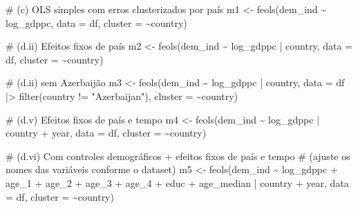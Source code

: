 \documentclass[
  portuguese,
  letterpaper,
  DIV=11,
  numbers=noendperiod]{scrartcl}
\newenvironment{Shaded}{\begin{snugshade}}{\end{snugshade}}
\newcommand{\AttributeTok}[1]{\textcolor[rgb]{0.40,0.45,0.13}{#1}}
\newcommand{\CommentTok}[1]{\textcolor[rgb]{0.37,0.37,0.37}{#1}}
\newcommand{\FunctionTok}[1]{\textcolor[rgb]{0.28,0.35,0.67}{#1}}
\newcommand{\NormalTok}[1]{\textcolor[rgb]{0.00,0.23,0.31}{#1}}
\newcommand{\OtherTok}[1]{\textcolor[rgb]{0.00,0.23,0.31}{#1}}
\newcommand{\SpecialCharTok}[1]{\textcolor[rgb]{0.37,0.37,0.37}{#1}}
\newcommand{\StringTok}[1]{\textcolor[rgb]{0.13,0.47,0.30}{#1}}
\begin{document}
\begin{Shaded}
\begin{Highlighting}[]
\CommentTok{\# (c) OLS simples com erros clusterizados por país}
\NormalTok{m1 }\OtherTok{\textless{}{-}} \FunctionTok{feols}\NormalTok{(dem\_ind }\SpecialCharTok{\textasciitilde{}}\NormalTok{ log\_gdppc,}
            \AttributeTok{data    =}\NormalTok{ df,}
            \AttributeTok{cluster =} \SpecialCharTok{\textasciitilde{}}\NormalTok{country)}

\CommentTok{\# (d.ii) Efeitos fixos de país}
\NormalTok{m2 }\OtherTok{\textless{}{-}} \FunctionTok{feols}\NormalTok{(dem\_ind }\SpecialCharTok{\textasciitilde{}}\NormalTok{ log\_gdppc }\SpecialCharTok{|}\NormalTok{ country,}
            \AttributeTok{data    =}\NormalTok{ df,}
            \AttributeTok{cluster =} \SpecialCharTok{\textasciitilde{}}\NormalTok{country)}

\CommentTok{\# (d.ii) sem Azerbaijão}
\NormalTok{m3 }\OtherTok{\textless{}{-}} \FunctionTok{feols}\NormalTok{(dem\_ind }\SpecialCharTok{\textasciitilde{}}\NormalTok{ log\_gdppc }\SpecialCharTok{|}\NormalTok{ country,}
            \AttributeTok{data    =}\NormalTok{ df }\SpecialCharTok{|\textgreater{}} \FunctionTok{filter}\NormalTok{(country }\SpecialCharTok{!=} \StringTok{"Azerbaijan"}\NormalTok{),}
            \AttributeTok{cluster =} \SpecialCharTok{\textasciitilde{}}\NormalTok{country)}

\CommentTok{\# (d.v) Efeitos fixos de país e tempo}
\NormalTok{m4 }\OtherTok{\textless{}{-}} \FunctionTok{feols}\NormalTok{(dem\_ind }\SpecialCharTok{\textasciitilde{}}\NormalTok{ log\_gdppc }\SpecialCharTok{|}\NormalTok{ country }\SpecialCharTok{+}\NormalTok{ year,}
            \AttributeTok{data    =}\NormalTok{ df,}
            \AttributeTok{cluster =} \SpecialCharTok{\textasciitilde{}}\NormalTok{country)}

\CommentTok{\# (d.vi) Com controles demográficos + efeitos fixos de país e tempo}
\CommentTok{\# (ajuste os nomes das variáveis conforme o dataset)}
\NormalTok{m5 }\OtherTok{\textless{}{-}} \FunctionTok{feols}\NormalTok{(dem\_ind }\SpecialCharTok{\textasciitilde{}}\NormalTok{ log\_gdppc }\SpecialCharTok{+}\NormalTok{ age\_1 }\SpecialCharTok{+}\NormalTok{ age\_2 }\SpecialCharTok{+}\NormalTok{ age\_3 }\SpecialCharTok{+}\NormalTok{ age\_4 }\SpecialCharTok{+}\NormalTok{ educ }\SpecialCharTok{+}\NormalTok{ age\_median }\SpecialCharTok{|}
\NormalTok{              country }\SpecialCharTok{+}\NormalTok{ year,}
            \AttributeTok{data    =}\NormalTok{ df,}
            \AttributeTok{cluster =} \SpecialCharTok{\textasciitilde{}}\NormalTok{country)}
\end{Highlighting}
\end{Shaded}
\end{document}
